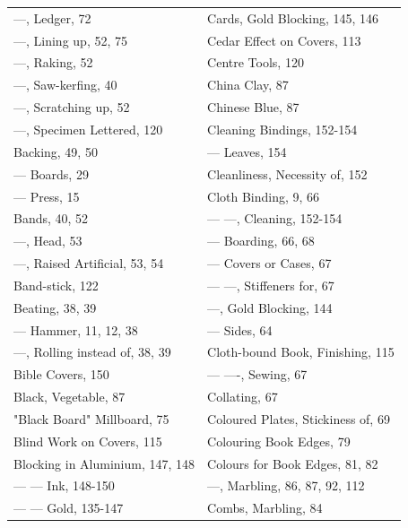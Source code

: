 \documentclass[twoside]{book}
\begin{document}
\begin{center}
\begin{tiny}
\begin{tabular}{l l}
---, Ledger, 72                 & Cards, Gold Blocking, 145, 146        \\
---, Lining up, 52, 75          & Cedar Effect on Covers, 113           \\
---, Raking, 52                 & Centre Tools, 120                     \\
---, Saw-kerfing, 40            & China Clay, 87                        \\
---, Scratching up, 52          & Chinese Blue, 87                      \\
---, Specimen Lettered, 120     & Cleaning Bindings, 152-154            \\
Backing, 49, 50                  & --- Leaves, 154                      \\
--- Boards, 29                  & Cleanliness, Necessity of, 152        \\
--- Press, 15                   & Cloth Binding, 9, 66                  \\
Bands, 40, 52                    & --- ---, Cleaning, 152-154          \\
---, Head, 53                   & --- Boarding, 66, 68                 \\
---, Raised Artificial, 53, 54  & --- Covers or Cases, 67              \\
Band-stick, 122                  & --- ---, Stiffeners for, 67         \\
Beating, 38, 39                  & ---, Gold Blocking, 144              \\
--- Hammer, 11, 12, 38          & --- Sides, 64                        \\
---, Rolling instead of, 38, 39 & Cloth-bound Book, Finishing, 115      \\
Bible Covers, 150                & --- ----, Sewing, 67                \\
Black, Vegetable, 87             & Collating, 67                         \\
"Black Board" Millboard, 75      & Coloured Plates, Stickiness of, 69    \\
Blind Work on Covers, 115        & Colouring Book Edges, 79              \\
Blocking in Aluminium, 147, 148  & Colours for Book Edges, 81, 82        \\
--- --- Ink, 148-150           & ---, Marbling, 86, 87, 92, 112       \\
--- --- Gold, 135-147          & Combs, Marbling, 84                   \\

\end{tabular}
\end{tiny}
\end{center}
\end{document}
